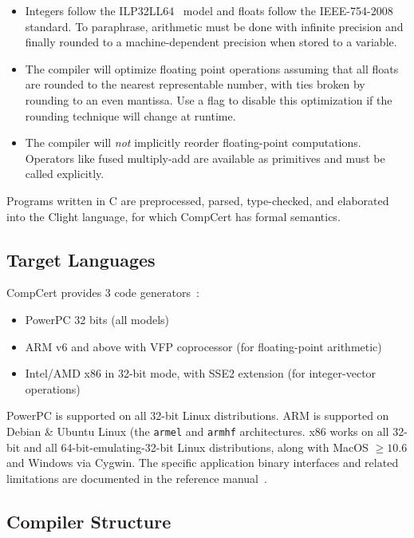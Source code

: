 \begin{itemize}
\item
  Integers follow the ILP32LL64~\cite{ilp32ll64} model and floats follow the IEEE-754-2008~\cite{ieee-754} standard.
  To paraphrase, arithmetic must be done with infinite precision and finally rounded to a machine-dependent precision when stored to a variable.
\item
  The compiler will optimize floating point operations assuming that all floats are rounded to the nearest representable number, with ties broken by rounding to an even mantissa.
  Use a flag to disable this optimization if the rounding technique will change at runtime.
\item
  The compiler will \emph{not} implicitly reorder floating-point computations.
  Operators like fused multiply-add are available as primitives and must be called explicitly.
\end{itemize}

Programs written in C are preprocessed, parsed, type-checked, and elaborated into the Clight language, for which CompCert has formal semantics.


\subsection{Target Languages}

CompCert provides 3 code generators~\cite{refman}:

\begin{itemize}
\item PowerPC 32 bits (all models)
\item ARM v6 and above with VFP coprocessor (for floating-point arithmetic)
\item Intel/AMD x86 in 32-bit mode, with SSE2 extension (for integer-vector operations)
\end{itemize}

PowerPC is supported on all 32-bit Linux distributions.
ARM is supported on Debian \& Ubuntu Linux (the {\tt armel} and {\tt armhf} architectures.
x86 works on all 32-bit and all 64-bit-emulating-32-bit Linux distributions, along with MacOS $\ge\!10.6$ and Windows via Cygwin.
The specific application binary interfaces and related limitations are documented in the reference manual~\cite{refman}.


\subsection{Compiler Structure}

